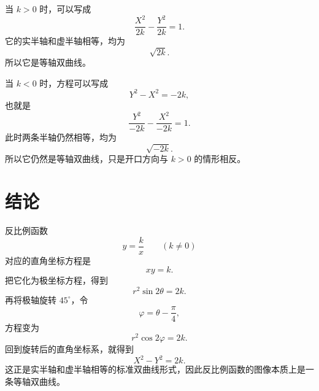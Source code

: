\documentclass[UTF8]{ctexart}
\begin{document}
当 \(k>0\) 时，可以写成
\[
  \frac{X^2}{2k}-\frac{Y^2}{2k}=1.
\]
它的实半轴和虚半轴相等，均为
\[
  \sqrt{2k}.
\]
所以它是等轴双曲线。

当 \(k<0\) 时，方程可以写成
\[
  Y^2-X^2=-2k,
\]
也就是
\[
  \frac{Y^2}{-2k}-\frac{X^2}{-2k}=1.
\]
此时两条半轴仍然相等，均为
\[
  \sqrt{-2k}.
\]
所以它仍然是等轴双曲线，只是开口方向与 \(k>0\) 的情形相反。

\section{结论}

反比例函数
\[
  y=\frac{k}{x}\qquad (k\ne 0)
\]
对应的直角坐标方程是
\[
  xy=k.
\]
把它化为极坐标方程，得到
\[
  r^2\sin 2\theta=2k.
\]
再将极轴旋转 \(45^\circ\)，令
\[
  \varphi=\theta-\frac{\pi}{4},
\]
方程变为
\[
  r^2\cos 2\varphi=2k.
\]
回到旋转后的直角坐标系，就得到
\[
  X^2-Y^2=2k.
\]
这正是实半轴和虚半轴相等的标准双曲线形式，因此反比例函数的图像本质上是一条等轴双曲线。
\end{document}
